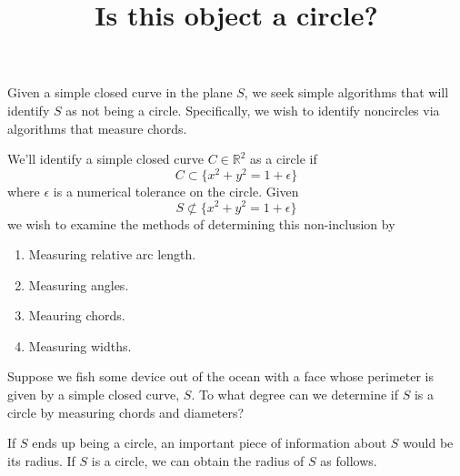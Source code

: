 \documentclass[11pt]{amsart}
\title{Is this object a circle?}
\author{}
\date{}
\newcommand{\R}{\mathbb{R}}
\theoremstyle{plain}
\theoremstyle{definition}
\theoremstyle{remark}
\begin{document}
\maketitle



Given a simple closed curve in the plane $S$, we seek simple
algorithms that will identify $S$ as not being a circle. Specifically,
we wish to identify noncircles via algorithms that measure chords.

We'll identify a simple closed curve $C\in\R^2$ as a circle if
\[
C\subset \{x^2+y^2 = 1 + \epsilon \}
\]
where $\epsilon$ is a numerical tolerance on the circle. Given
\[
S\not\subset \{x^2+y^2 = 1 + \epsilon \}
\]
we wish to examine the methods of determining this non-inclusion by
\begin{enumerate}
\item Measuring relative arc length.
\item Measuring angles.
\item Meauring chords.
\item Measuring widths.
\end{enumerate}

Suppose we fish some device out of the ocean with a face whose
perimeter is given by a simple closed curve, \(S\).  To what degree
can we determine if \(S\) is a circle by measuring chords and
diameters?


If \(S\) ends up being a circle, an important piece of information
about \(S\) would be its radius.  If \(S\) is a circle, we can obtain
the radius of \(S\) as follows.
\end{document}
